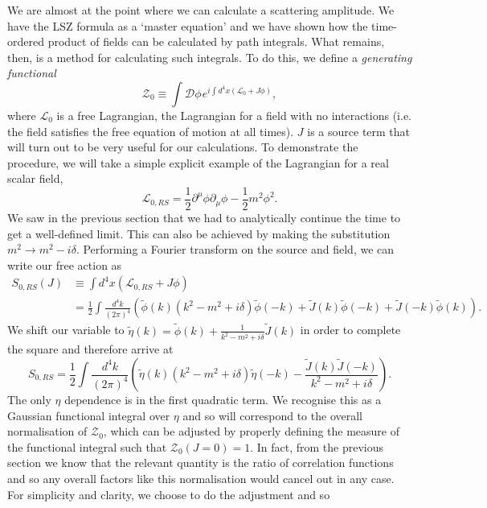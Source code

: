 We are almost at the point where we can calculate a scattering amplitude. We have the LSZ formula as a `master equation' and we have shown how the time-ordered product of fields can be calculated by path integrals. What remains, then, is a method for calculating such integrals. To do this, we define a \emph{generating functional}
\begin{equation}
\mathcal{Z}_0 \equiv \int \mathcal{D} \phi \hspace{1pt} e^{i \int d^4x (\mathscr{L}_0 + J \phi)},
\end{equation}
where $\mathscr{L}_0$ is a free Lagrangian, the Lagrangian for a field with no interactions (i.e. the field satisfies the free equation of motion at all times). $J$ is a source term that will turn out to be very useful for our calculations. To demonstrate the procedure, we will take a simple explicit example of the Lagrangian for a real scalar field,
\begin{equation}
\mathscr{L}_{0,RS} = \frac{1}{2}\partial^\mu \phi \partial_\mu \phi - \frac{1}{2} m^2 \phi^2.
\end{equation} 
We saw in the previous section that we had to analytically continue the time to get a well-defined limit. This can also be achieved by making the substitution $m^2 \to m^2 - i \delta$. Performing a Fourier transform on the source and field, we can write our free action as
\begin{equation}
\begin{split}
S_{0,RS}(J) & \equiv \int d^4 x (\mathscr{L}_{0,RS} + J \phi) \\
&= \frac{1}{2} \int \frac{d^4k}{(2 \pi)^4} \left(\tilde{\phi}(k)(k^2 - m^2 + i \delta) \tilde{\phi}(-k) + \tilde{J}(k) \tilde{\phi}(-k) + \tilde{J}(-k)\tilde{\phi}(k) \right).
\end{split}
\end{equation}
We shift our variable to $\tilde{\eta}(k) = \tilde{\phi}(k) + \frac{1}{k^2 - m^2 + i \delta}\tilde{J}(k)$ in order to complete the square and therefore arrive at
\begin{equation}
S_{0, RS} = \frac{1}{2} \int \frac{d^4 k}{(2 \pi)^4} \left(\tilde{\eta}(k)(k^2 - m^2 + i \delta) \tilde{\eta}(-k) - \frac{\tilde{J}(k)\tilde{J}(-k)}{k^2 - m^2 + i \delta} \right).
\label{eqn:real_scalar}
\end{equation}
The only $\eta$ dependence is in the first quadratic term. We recognise this as a Gaussian functional integral over $\eta$ and so will correspond to the overall normalisation of $\mathcal{Z}_0$, which can be adjusted by properly defining the measure of the functional integral such that $\mathcal{Z}_0(J = 0) = 1$. In fact, from the previous section we know that the relevant quantity is the ratio of correlation functions and so any overall factors like this normalisation would cancel out in any case. For simplicity and clarity, we choose to do the adjustment and so
